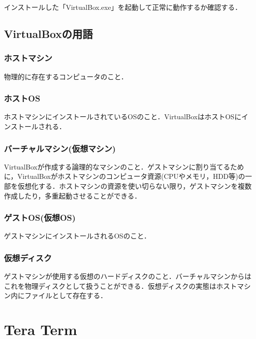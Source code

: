 インストールした「VirtualBox.exe」を起動して正常に動作するか確認する．

\newpage

\subsection{VirtualBoxの用語}

\subsubsection{ホストマシン}

物理的に存在するコンピュータのこと．

\subsubsection{ホストOS}

ホストマシンにインストールされているOSのこと．VirtualBoxはホストOSにインストールされる．

\subsubsection{バーチャルマシン(仮想マシン)}

VirtualBoxが作成する論理的なマシンのこと．ゲストマシンに割り当てるために，VirtualBoxがホストマシンのコンピュータ資源(CPUやメモリ，HDD等)の一部を仮想化する．ホストマシンの資源を使い切らない限り，ゲストマシンを複数作成したり，多重起動させることができる．

\subsubsection{ゲストOS(仮想OS)}

ゲストマシンにインストールされるOSのこと．

\subsubsection{仮想ディスク}

ゲストマシンが使用する仮想のハードディスクのこと．バーチャルマシンからはこれを物理ディスクとして扱うことができる．仮想ディスクの実態はホストマシン内にファイルとして存在する．

\newpage

\section{Tera Term}


